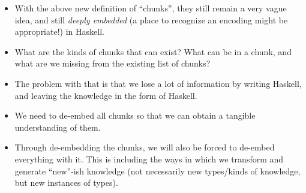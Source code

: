 \begin{itemize}

      \item With the above new definition of ``chunks'', they still remain a
            very vague idea, and still \textit{deeply embedded} (a place to
            recognize an encoding might be appropriate!) in Haskell.

      \item What are the kinds of chunks that can exist? What can be in a chunk,
            and what are we missing from the existing list of chunks?

      \item The problem with that is that we lose a lot of information by
            writing Haskell, and leaving the knowledge in the form of Haskell.

      \item We need to de-embed all chunks so that we can obtain a tangible
            understanding of them.

      \item Through de-embedding the chunks, we will also be forced to de-embed
            everything with it. This is including the ways in which we transform
            and generate ``new''-ish knowledge (not necessarily new types/kinds
            of knowledge, but new instances of types).

\end{itemize}
